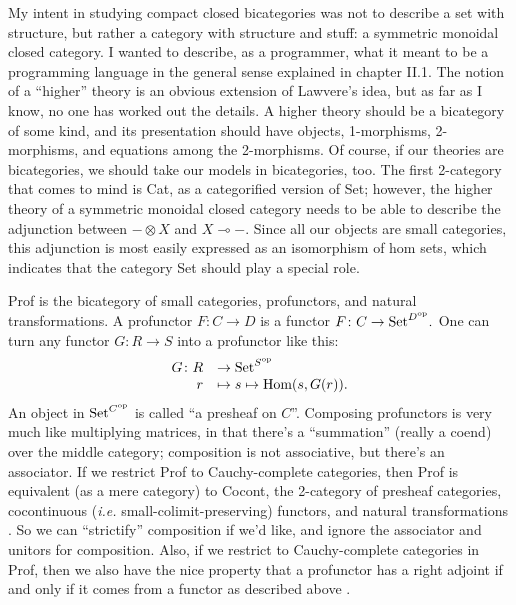 \documentclass[12pt,twoside,openright]{report}
\newcommand{\Set}{\mathrm{Set}}
\newcommand{\maps}{\colon}
\newcommand{\lhom}{\multimap}
\newcommand{\op}{{\rm op}}
\newcommand{\Hom}{\mbox{Hom}}
\begin{document}
My intent in studying compact closed bicategories was not to describe a set with structure, but rather a category with structure and stuff: a symmetric monoidal closed category.  I wanted to describe, as a programmer, what it meant to be a programming language in the general sense explained in chapter II.1.  The notion of a ``higher'' theory is an obvious extension of Lawvere's idea, but as far as I know, no one has worked out the details.  A higher theory should be a bicategory of some kind, and its presentation should have objects, 1-morphisms, 2-morphisms, and equations among the 2-morphisms.  Of course, if our theories are bicategories, we should take our models in bicategories, too.  The first 2-category that comes to mind is Cat, as a categorified version of Set; however, the higher theory of a symmetric monoidal closed category needs to be able to describe the adjunction between $- \otimes X$ and $X \lhom -$.  Since all our objects are small categories, this adjunction is most easily expressed as an isomorphism of hom sets, which indicates that the category Set should play a special role.

Prof is the bicategory of small categories, profunctors, and natural transformations.  A profunctor $F\maps C \to D$ is a functor $F\maps C \to \Set^{D^{\op}}.$  One can turn any functor $G\maps R \to S$ into a profunctor like this:
\[ \begin{array}{rl}G\maps R &\to \Set^{S^{\op}} \\ r & \mapsto s \mapsto \Hom(s, G(r)).\end{array} \]
An object in $\Set^{C^{\op}}$ is called ``a presheaf on $C$''.  Composing profunctors is very much like multiplying matrices, in that there's a ``summation'' (really a coend) over the middle category; composition is not associative, but there's an associator.  If we restrict Prof to Cauchy-complete categories, then Prof is equivalent (as a mere category) to Cocont, the 2-category of presheaf categories, cocontinuous ({\em i.e.} small-colimit-preserving) functors, and natural transformations \cite[2.7.4]{KS06}.  So we can ``strictify'' composition if we'd like, and ignore the associator and unitors for composition.  Also, if we restrict to Cauchy-complete categories in Prof, then we also have the nice property that a profunctor has a right adjoint if and only if it comes from a functor as described above \cite[Theorem 4.51]{Kelly82}.
\end{document}
